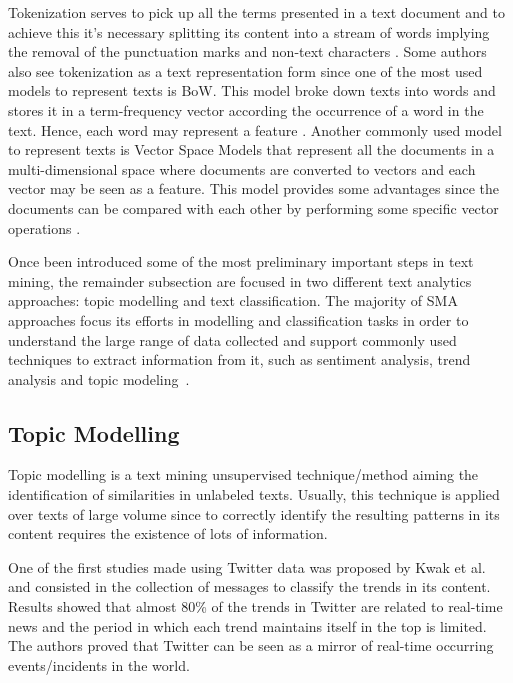 Tokenization serves to pick up all the terms presented in a text document and to achieve this it's necessary splitting its content into a stream of words implying the removal of the punctuation marks and non-text characters \cite{kn:Hotho2005}. Some authors also see tokenization as a text representation form since one of the most used models to represent texts is \gls{BoW}. This model broke down texts into words and stores it in a term-frequency vector according the occurrence of a word in the text. Hence, each word may represent a feature \cite{kn:Sriram2010}. Another commonly used model to represent texts is Vector Space Models that represent all the documents in a multi-dimensional space where documents are converted to vectors and each vector may be seen as a feature. This model provides some advantages since the documents can be compared with each other by performing some specific vector operations \cite{kn:Hotho2005}.

Once been introduced some of the most preliminary important steps in text mining, the remainder subsection are focused in two different text analytics approaches: topic modelling and text classification. The majority of \gls{SMA} approaches focus its efforts in modelling and classification tasks in order to understand the large range of data collected and support commonly used techniques to extract information from it, such as sentiment analysis, trend analysis and topic modeling~\cite{kn:Fan2013}.

\subsection{Topic Modelling}
\label{subsec:topic_modelling_sota}

Topic modelling is a text mining unsupervised technique/method aiming the identification of similarities in unlabeled texts. Usually, this technique is applied over texts of large volume since to correctly identify the resulting patterns in its content requires the existence of lots of information.

One of the first studies made using Twitter data was proposed by Kwak et al.~\cite{kwak2010twitter} and consisted in the collection of messages to classify the trends in its content. Results showed that almost 80\% of the trends in Twitter are related to real-time news and the period in which each trend maintains itself in the top is limited. The authors proved that Twitter can be seen as a mirror of real-time occurring events/incidents in the world.


